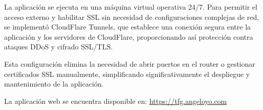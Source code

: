 La aplicación se ejecuta en una máquina virtual operativa 24/7. Para permitir el acceso externo y habilitar SSL sin necesidad de configuraciones complejas de red, se implementó CloudFlare Tunnels, que establece una conexión segura entre la aplicación y los servidores de CloudFlare, proporcionando así protección contra ataques DDoS y cifrado SSL/TLS.

Esta configuración elimina la necesidad de abrir puertos en el router o gestionar certificados SSL manualmente, simplificando significativamente el despliegue y mantenimiento de la aplicación.

La aplicación web se encuentra disponible en: \url{https://tfg.angeloyo.com}
